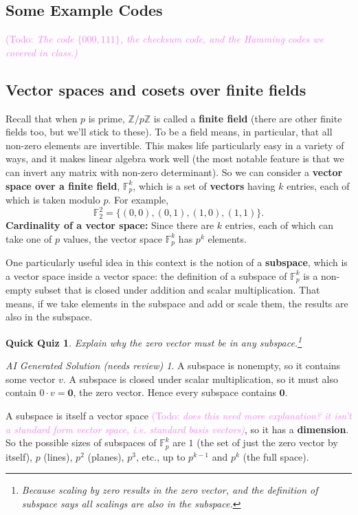 \documentclass{article}
\theoremstyle{plain}
\newtheorem{quiz}[theorem]{Quick Quiz}
\theoremstyle{definition}
\theoremstyle{remark}
\newtheorem*{aisolution}{AI Generated Solution (needs review)}
\numberwithin{theorem}{section}
\newcommand{\KS}[1]{\textcolor{violet}{{\sf (Todo:} {\sl{#1})}}}
\newcommand{\KS}[1]{}
\newcommand{\FF}{\mathbb{F}}
\newcommand{\ZZ}{\mathbb{Z}}
\begin{document}
\subsection{Some Example Codes}

\KS{The code $\{000,111\}$, the checksum code, and the Hamming codes we covered in class.}


\subsection{Vector spaces and cosets over finite fields}

Recall that when $p$ is prime, $\ZZ/p\ZZ$ is called a \textbf{finite field} (there are other finite fields too, but we'll stick to these).  To be a field means, in particular, that all non-zero elements are invertible.  This makes life particularly easy in a variety of ways, and it makes linear algebra work well (the most notable feature is that we can invert any matrix with non-zero determinant).  So we can consider a \textbf{vector space over a finite field}, $\FF_p^k$, which is a set of \textbf{vectors} having $k$ entries, each of which is taken modulo $p$.  For example,
\[
\FF_2^2 = \{ (0,0), (0,1), (1,0), (1,1) \}.
\]
\textbf{Cardinality of a vector space:}  Since there are $k$ entries, each of which can take one of $p$ values, the vector space $\FF_p^k$ has $p^k$ elements.

One particularly useful idea in this context is the notion of a \textbf{subspace}, which is a vector space inside a vector space:  the definition of a subspace of $\FF_p^k$ is a non-empty subset that is closed under addition and scalar multiplication.  That means, if we take elements in the subspace and add or scale them, the results are also in the subspace.

\begin{quiz}
    Explain why the zero vector must be in any subspace.\footnote{Because scaling by zero results in the zero vector, and the definition of subspace says all scalings are also in the subspace.}
\end{quiz}
\begin{aisolution}
A subspace is nonempty, so it contains some vector $v$.  A subspace is closed under scalar multiplication, so it must also contain $0\cdot v = \mathbf{0}$, the zero vector.  Hence every subspace contains $\mathbf{0}$.
\end{aisolution}

A subspace is itself a vector space \KS{does this need more explanation?  it isn't a standard form vector space, i.e. standard basis vectors}, so it has a \textbf{dimension}.  So the possible sizes of subspaces of $\FF_p^k$ are $1$ (the set of just the zero vector by itself), $p$ (lines), $p^2$ (planes), $p^3$, etc., up to $p^{k-1}$ and $p^k$ (the full space).
\end{document}
